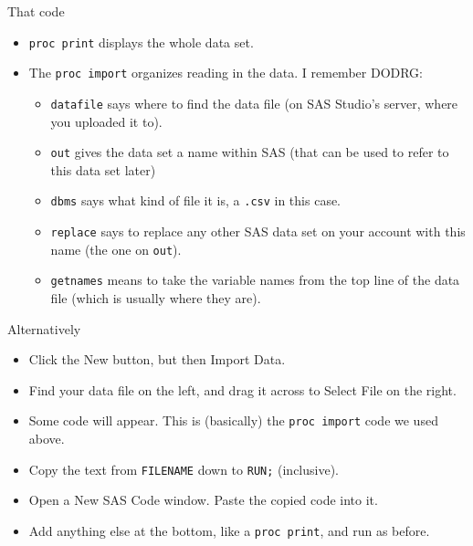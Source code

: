 \documentclass[unknownkeysallowed]{beamer}\usepackage[]{graphicx}\usepackage[]{color}
\begin{document}
\begin{frame}[fragile]{That code}
  
  \begin{itemize}
  \item \texttt{proc print} displays the whole data set.
  \item The \texttt{proc import} organizes reading in the data. I
    remember DODRG:
    \begin{itemize}
    \item \texttt{datafile} says where to find the data file (on SAS
      Studio's server, where you uploaded it to).
    \item \texttt{out} gives the data set a name within SAS (that can
      be used to refer to this data set later)
    \item \texttt{dbms} says what kind of file it is, a \texttt{.csv}
      in this case.
    \item \texttt{replace} says to replace any other SAS data set on
      your account with this name (the one on \texttt{out}).
    \item \texttt{getnames} means to take the variable names from the
      top line of the data file (which is usually where they are). 
    \end{itemize}
  \end{itemize}
  
\end{frame}

\begin{frame}[fragile]{Alternatively}
  
  \begin{itemize}
  \item Click the New button, but then Import Data.
  \item Find your data file on the left, and drag it across to Select
    File on the right.
  \item Some code will appear. This is (basically) the \texttt{proc
      import} code we used above.
  \item Copy the text from \texttt{FILENAME} down to \texttt{RUN;}
    (inclusive).
  \item Open a New SAS Code window. Paste the copied code into it.
  \item Add anything else at the bottom, like a \texttt{proc print},
    and run as before.
  \end{itemize}
  
\end{frame}
\end{document}
